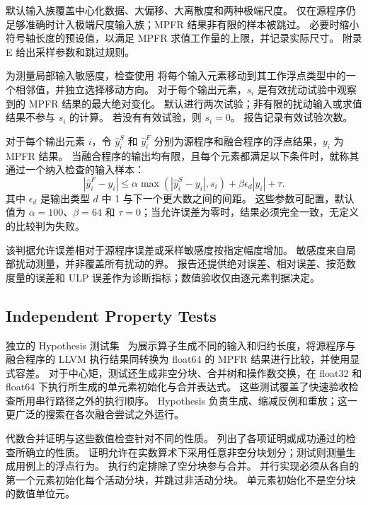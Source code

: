 默认输入族覆盖中心化数据、大偏移、大离散度和两种极端尺度。
仅在源程序仍足够准确时计入极端尺度输入族；MPFR 结果非有限的样本被跳过。
必要时缩小符号轴长度的预设值，以满足 MPFR 求值工作量的上限，并记录实际尺寸。
附录 E 给出采样参数和跳过规则。

为测量局部输入敏感度，检查使用  将每个输入元素移动到其工作浮点类型中的一个相邻值，并独立选择移动方向。
对于每个输出元素，$s_i$ 是有效扰动试验中观察到的 MPFR 结果的最大绝对变化。
默认进行两次试验；非有限的扰动输入或求值结果不参与 $s_i$ 的计算。
若没有有效试验，则 $s_i=0$。
报告记录有效试验次数。

\begin{definition}
\label{def:gate}
对于每个输出元素 $i$，令 $\hat y_i^{S}$ 和 $\hat y_i^{F}$ 分别为源程序和融合程序的浮点结果，$y_i$ 为 MPFR 结果。
当融合程序的输出均有限，且每个元素都满足以下条件时，就称其通过一个纳入检查的输入样本：
\[
|\hat y_i^{F}-y_i|
\leq
\alpha\max\!\left(|\hat y_i^{S}-y_i|,s_i\right)
+\beta\epsilon_d|y_i|+\tau.
\]
其中 $\epsilon_d$ 是输出类型 $d$ 中 1 与下一个更大数之间的间距。
这些参数可配置，默认值为 $\alpha=100$、$\beta=64$ 和 $\tau=0$；当允许误差为零时，结果必须完全一致，无定义的比较判为失败。
\end{definition}

该判据允许误差相对于源程序误差或采样敏感度按指定幅度增加。
敏感度来自局部扰动测量，并非覆盖所有扰动的界。
报告还提供绝对误差、相对误差、按范数度量的误差和 ULP 误差作为诊断指标；数值验收仅由逐元素判据决定。

\subsection{Independent Property Tests}
\label{sec:accuracy-limits}

独立的 Hypothesis 测试集~\citep{hypothesis} 为展示算子生成不同的输入和归约长度，将源程序与融合程序的 LLVM 执行结果同转换为 float64 的 MPFR 结果进行比较，并使用显式容差。
对于中心矩，测试还生成非空分块、合并树和操作数交换，在 float32 和 float64 下执行所生成的单元素初始化与合并表达式。
这些测试覆盖了快速验收检查所用串行路径之外的执行顺序。
Hypothesis 负责生成、缩减反例和重放；这一更广泛的搜索在各次融合尝试之外运行。

代数合并证明与这些数值检查针对不同的性质。
 列出了各项证明或成功通过的检查所确立的性质。
证明允许在实数算术下采用任意非空分块划分；测试则测量生成用例上的浮点行为。
执行约定排除了空分块参与合并。
并行实现必须从各自的第一个元素初始化每个活动分块，并跳过非活动分块。
单元素初始化不是空分块的数值单位元。

